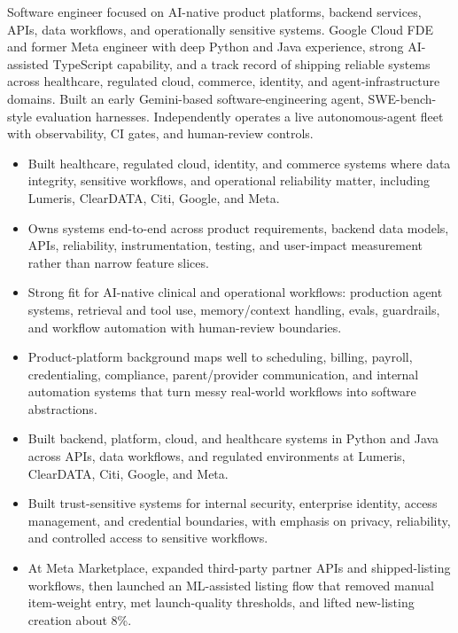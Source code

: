 


Software engineer focused on AI-native product platforms, backend services, APIs, data workflows, and operationally sensitive systems. Google Cloud FDE and former Meta engineer with deep Python and Java experience, strong AI-assisted TypeScript capability, and a track record of shipping reliable systems across healthcare, regulated cloud, commerce, identity, and agent-infrastructure domains. Built an early Gemini-based software-engineering agent, SWE-bench-style evaluation harnesses. Independently operates a live autonomous-agent fleet with observability, CI gates, and human-review controls.
\begin{itemize}
  \item Built healthcare, regulated cloud, identity, and commerce systems where data integrity, sensitive workflows, and operational reliability matter, including Lumeris, ClearDATA, Citi, Google, and Meta.
  \item Owns systems end-to-end across product requirements, backend data models, APIs, reliability, instrumentation, testing, and user-impact measurement rather than narrow feature slices.
  \item Strong fit for AI-native clinical and operational workflows: production agent systems, retrieval and tool use, memory/context handling, evals, guardrails, and workflow automation with human-review boundaries.
  \item Product-platform background maps well to scheduling, billing, payroll, credentialing, compliance, parent/provider communication, and internal automation systems that turn messy real-world workflows into software abstractions.
\end{itemize}
\begin{itemize}
  \item Built backend, platform, cloud, and healthcare systems in Python and Java across APIs, data workflows, and regulated environments at Lumeris, ClearDATA, Citi, Google, and Meta.
  \item Built trust-sensitive systems for internal security, enterprise identity, access management, and credential boundaries, with emphasis on privacy, reliability, and controlled access to sensitive workflows.
  \item At Meta Marketplace, expanded third-party partner APIs and shipped-listing workflows, then launched an ML-assisted listing flow that removed manual item-weight entry, met launch-quality thresholds, and lifted new-listing creation about 8\%.
\end{itemize}
